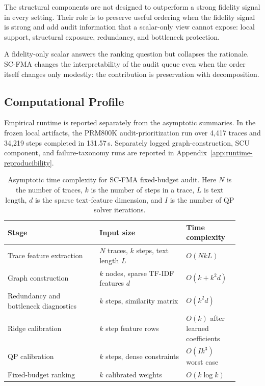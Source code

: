 \documentclass[a4paper,fleqn]{cas-sc}
\begin{document}
The structural components are not designed to outperform a strong fidelity signal in every setting. Their role is to preserve useful ordering when the fidelity signal is strong and add audit information that a scalar-only view cannot expose: local support, structural exposure, redundancy, and bottleneck protection.

A fidelity-only scalar answers the ranking question but collapses the rationale. SC-FMA changes the interpretability of the audit queue even when the order itself changes only modestly: the contribution is preservation with decomposition.

\subsection{Computational Profile}

Empirical runtime is reported separately from the asymptotic summaries. In the frozen local artifacts, the PRM800K audit-prioritization run over 4,417 traces and 34,219 steps completed in 131.57\,s. Separately logged graph-construction, SCU component, and failure-taxonomy runs are reported in Appendix~\ref{app:runtime-reproducibility}.

\begin{table}[ht]
\caption{Asymptotic time complexity for SC-FMA fixed-budget audit. Here $N$ is the number of traces, $k$ is the number of steps in a trace, $L$ is text length, $d$ is the sparse text-feature dimension, and $I$ is the number of QP solver iterations.}
\label{tab:complexity-summary}
\centering
\small
\renewcommand{\arraystretch}{1.08}
\begin{tabular}{p{0.36\linewidth}p{0.34\linewidth}p{0.20\linewidth}}
\toprule
\textbf{Stage} & \textbf{Input size} & \textbf{Time complexity} \\
\midrule
Trace feature extraction & $N$ traces, $k$ steps, text length $L$ & $O(NkL)$ \\
Graph construction & $k$ nodes, sparse TF-IDF features $d$ & $O(k+k^2d)$ \\
Redundancy and bottleneck diagnostics & $k$ steps, similarity matrix & $O(k^2d)$ \\
Ridge calibration & $k$ step feature rows & $O(k)$ after learned coefficients \\
QP calibration & $k$ steps, dense constraints & $O(Ik^3)$ worst case \\
Fixed-budget ranking & $k$ calibrated weights & $O(k\log k)$ \\
\bottomrule
\end{tabular}
\end{table}
\end{document}
